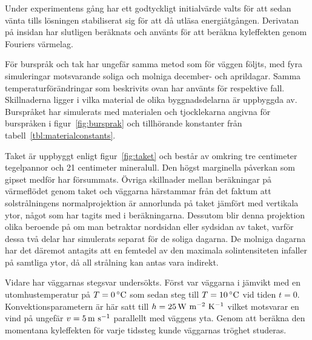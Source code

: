 Under experimentens gång  har ett godtyckligt initialvärde valts för att sedan vänta tills
lösningen stabiliserat sig för att då utläsa energiåtgången. Derivatan på insidan har slutligen beräknats
och använts för att beräkna kyleffekten genom Fouriers värmelag.

För burspråk och tak har ungefär samma metod som för väggen följts, med fyra simuleringar motsvarande soliga och
molniga december- och aprildagar. Samma temperaturförändringar som beskrivits ovan har använts för
respektive fall. Skillnaderna ligger i vilka material de olika byggnadsdelarna är uppbyggda av.
Burspråket har simulerats med materialen och tjocklekarna angivna för burspråken i figur~\ref{fig:bursprak} och tillhörande konstanter från tabell~\ref{tbl:materialconstants}.

Taket är uppbyggt enligt figur~\ref{fig:taket} och består av omkring tre centimeter tegelpannor och 21 centimeter mineralull. Den högst marginella påverkan som gipset medför har försummats. Övriga skillnader mellan beräkningar på värmeflödet genom taket och väggarna härstammar från det faktum att solstrålningens normalprojektion är annorlunda på taket jämfört med vertikala ytor, något som har tagits med i beräkningarna. Dessutom blir denna projektion olika beroende på om man betraktar nordsidan eller sydsidan av taket, varför dessa två delar har simulerats separat för de soliga dagarna. De molniga dagarna har det däremot antagits att en femtedel av den maximala solintensiteten infaller på samtliga ytor, då all strålning kan antas vara indirekt.

Vidare har väggarnas stegsvar undersökts. Först var väggarna i jämvikt med en utomhustemperatur på $T = \unit[0]{^\circ C}$ som sedan steg till $T = \unit[10]{^\circ C}$ vid tiden $t=0$. Konvektionsparametern är här satt till
$h = \unit[25]{W~m^{-2}~K^{-1}}$ vilket motsvarar en vind på ungefär 
$v = \unit[5]{m~s^{-1}}$ parallellt med väggens yta. Genom att beräkna den momentana kyleffekten för varje tidssteg kunde väggarnas tröghet studeras.
